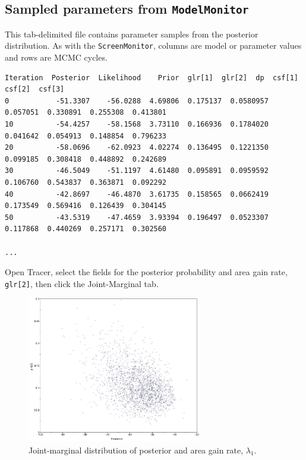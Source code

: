 \documentclass[11pt]{article}
\begin{document}
\subsection{Sampled parameters from {\tt ModelMonitor}}

This tab-delimited file contains parameter samples from the posterior distribution.
As with the {\tt ScreenMonitor}, columns are model or parameter values and rows are MCMC cycles.

\begin{framed}
\begin{lstlisting}[basicstyle=\tiny \listingsfont, columns=texcl]
Iteration  Posterior  Likelihood    Prior  glr[1]  glr[2]  dp  csf[1]  csf[2]  csf[3]
0           -51.3307    -56.0288  4.69806  0.175137  0.0580957  0.057051  0.330891  0.255308  0.413801
10          -54.4257    -58.1568  3.73110  0.166936  0.1784020  0.041642  0.054913  0.148854  0.796233
20          -58.0696    -62.0923  4.02274  0.136495  0.1221350  0.099185  0.308418  0.448892  0.242689
30          -46.5049    -51.1197  4.61480  0.095891  0.0959592  0.106760  0.543837  0.363871  0.092292
40          -42.8697    -46.4870  3.61735  0.158565  0.0662419  0.173549  0.569416  0.126439  0.304145
50          -43.5319    -47.4659  3.93394  0.196497  0.0523307  0.117868  0.440269  0.257171  0.302560

...
\end{lstlisting}
\end{framed}

Open Tracer, select the fields for the posterior probability and area gain rate, {\tt glr[2]}, then click the Joint-Marginal tab.

\begin{figure}[H]
\centering
\includegraphics[width=3in]{figures/joint_rgain_posterior}
\caption{Joint-marginal distribution of posterior and area gain rate, $\lambda_1$.}
\end{figure}
\end{document}
